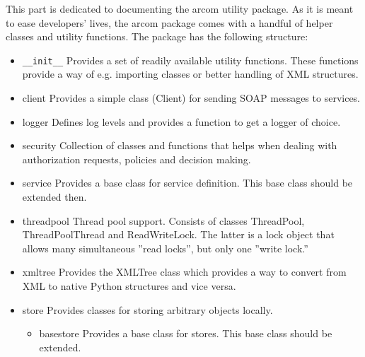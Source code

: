 \documentclass{article}
\begin{document}
This part is dedicated to documenting the arcom utility package.
As it is meant to ease developers' lives, the arcom package comes
with a handful of helper classes and utility functions.
The package has the following structure:
\begin{itemize}

  \item{\verb$__init__$\newline
  Provides a set of readily available utility functions. These functions provide a way 
  of e.g. importing classes or better handling of XML structures.
  }

  \item{client\newline
  Provides a simple class (Client) for sending SOAP messages to services.
  }

  \item{logger\newline
  Defines log levels and provides a function to get a logger of choice.
  }

  \item{security\newline
  Collection of classes and functions that helps when dealing with authorization requests,
  policies and decision making.
  }

  \item{service\newline
  Provides a base class for service definition. This base class should be extended then.
  }

  \item{threadpool\newline
  Thread pool support. Consists of classes ThreadPool, ThreadPoolThread and ReadWriteLock.
  The latter is a lock object that allows many simultaneous ''read locks'', but only one 
  ''write lock.''
  }

  \item{xmltree\newline
  Provides the XMLTree class which provides a way to convert from XML to native Python 
  structures and vice versa.
  }

  \item{store\newline
  Provides classes for storing arbitrary objects locally.
  }

  \begin{itemize}

    \item{basestore\newline
    Provides a base class for stores. This base class should be extended.
    }


\end{itemize}
\end{itemize}
\end{document}
